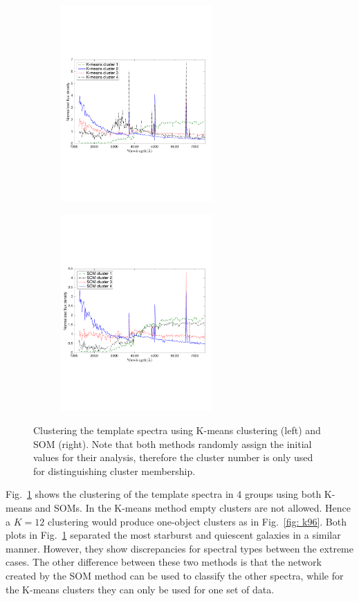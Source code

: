     \begin{figure}
                \begin{subfigure}[b]{0.49\textwidth}
                    \centering
                  \includegraphics[width=.99\textwidth, height= 7.5cm]{k_means_images/classified_group_in_4cluster.pdf}
                \end{subfigure}
                \hfill
                \begin{subfigure}[b]{0.49\textwidth}
                    \centering \includegraphics[width=.99\textwidth, height= 7.5cm]{k_means_images/classified_group_in_4cluster_som.pdf}
                \end{subfigure}
                \caption{Clustering the  template spectra using K-means clustering (left) and SOM (right). Note that both methods randomly assign the initial values for their analysis, therefore the cluster number is only used for distinguishing cluster membership.}
                 \label{fig: som_k_means_4}
    \end{figure}
    Fig.~\ref{fig: som_k_means_4} shows the clustering of the template spectra in 4 groups using both K-means and SOMs.
    In the K-means method empty clusters are not allowed. 
    Hence a $K=12$ clustering would produce one-object clusters as in Fig.~\ref{fig: k96}.
    Both plots in Fig.~\ref{fig: som_k_means_4} separated the most starburst and quiescent galaxies in a similar manner.
    However, they show discrepancies for spectral types between the extreme cases. 
    The other difference between these two methods is that the network created by the SOM method can be used to classify the other spectra, while for the K-means clusters they can only be used for one set of data.



